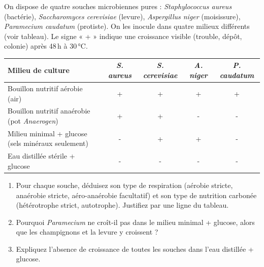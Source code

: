 \documentclass[11pt]{article}
\begin{document}
\begin{exercice}
On dispose de quatre souches microbiennes pures : \emph{Staphylococcus aureus} (bactérie), \emph{Saccharomyces cerevisiae} (levure), \emph{Aspergillus niger} (moisissure), \emph{Paramecium caudatum} (protiste). On les inocule dans quatre milieux différents (voir tableau). Le signe « + » indique une croissance visible (trouble, dépôt, colonie) après 48\,h à 30\,°C.

\begin{tabular}{|l|c|c|c|c|}
\hline
\textbf{Milieu de culture} & \emph{S. aureus} & \emph{S. cerevisiae} & \emph{A. niger} & \emph{P. caudatum} \\
\hline
Bouillon nutritif aérobie (air) & + & + & + & + \\
\hline
Bouillon nutritif anaérobie (pot \emph{Anaerogen}) & + & + & - & - \\
\hline
Milieu minimal + glucose (sels minéraux seulement) & - & + & + & - \\
\hline
Eau distillée stérile + glucose & - & - & - & - \\
\hline
\end{tabular}

\begin{enumerate}
    \item Pour chaque souche, déduisez son type de respiration (aérobie stricte, anaérobie stricte, aéro-anaérobie facultatif) et son type de nutrition carbonée (hétérotrophe strict, autotrophe). Justifiez par une ligne du tableau.
    \item Pourquoi \emph{Paramecium} ne croît-il pas dans le milieu minimal + glucose, alors que les champignons et la levure y croissent ?
    \item Expliquez l'absence de croissance de toutes les souches dans l'eau distillée + glucose.
\end{enumerate}
\end{exercice}
\end{document}

